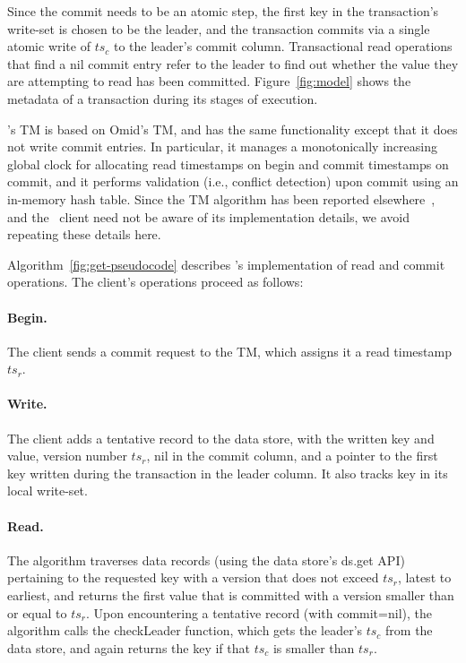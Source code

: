 Since the commit needs to be an atomic step, the first key in the transaction's write-set is chosen to be the leader, and the transaction commits via a single atomic write of $ts_c$ to the leader's commit column. Transactional read operations that find a nil commit entry 
refer to the leader to find out whether the value they are attempting to read has been committed.
Figure~\ref{fig:model} shows the metadata of a transaction during its stages of execution. 

\sys's TM is based on Omid's TM, and has the same functionality except that it does not write commit entries.
In particular, it manages a monotonically increasing global clock for allocating read timestamps on begin and commit timestamps on commit,
and it performs validation (i.e., conflict detection) upon commit using an in-memory hash table. 
Since the TM algorithm has been reported elsewhere~\cite{Omid2017}, and the \sys\ client need not be aware of 
its implementation details, we avoid repeating these details here. 

Algorithm~\ref{fig:get-pseudocode} describes \sys's implementation of read and commit operations.
The client's operations proceed as follows:

\paragraph{Begin.}
The client sends a commit request to the TM, which assigns it a read timestamp $ts_r$.

\paragraph{Write.}
The client adds a tentative record to the data store, with the written key and value, version number $ts_r$, 
nil in the commit column, and a pointer to the first key written during the transaction in the leader column.
It also tracks key in its local write-set.


\paragraph{Read.}
The algorithm traverses data  records (using the data store's ds.get API) pertaining
to the requested key with a version that does not exceed $ts_r$, latest to earliest, and returns the first value that is committed
with a  version smaller than or equal to $ts_r$. Upon
encountering a tentative record (with commit=nil), the algorithm calls the {\sc checkLeader} function, which
gets the leader's $ts_c$ from the data store, and again returns the key if that $ts_c$ is smaller than $ts_r$. 

